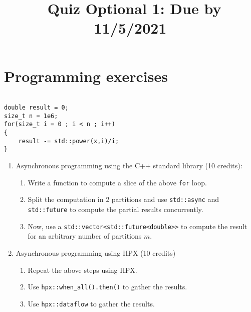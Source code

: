 \documentclass[11pt]{article}
\begin{document}
\title{\coursename~Quiz Optional 1: Due by 11/5/2021}
\date{}
\maketitle

\medskip



\section*{Programming exercises}

\begin{lstlisting}

double result = 0;
size_t n = 1e6;
for(size_t i = 0 ; i < n ; i++)
{
	result -= std::power(x,i)/i;
}

\end{lstlisting} 


\begin{enumerate}

\item
Asynchronous programming using the C++ standard library  (10 credits): \\
\begin{enumerate}
\item Write a function to compute a slice of the above \lstinline{for} loop.
\item Split the computation in 2 partitions and use \lstinline{std::async} and \lstinline{std::future} to compute the partial results concurrently. 
\item Now, use a \lstinline{std::vector<std::future<double>>} to compute the result for an arbitrary number of partitions $m$.
\end{enumerate}


\item Asynchronous programming using HPX (10 credits)\\

\begin{enumerate}
\item Repeat the above steps using HPX.
\item Use \lstinline{hpx::when_all().then()} to gather the results.
\item Use \lstinline{hpx::dataflow} to gather the results.
\end{enumerate}



\end{enumerate}

\doclicenseThis 
\end{document}
